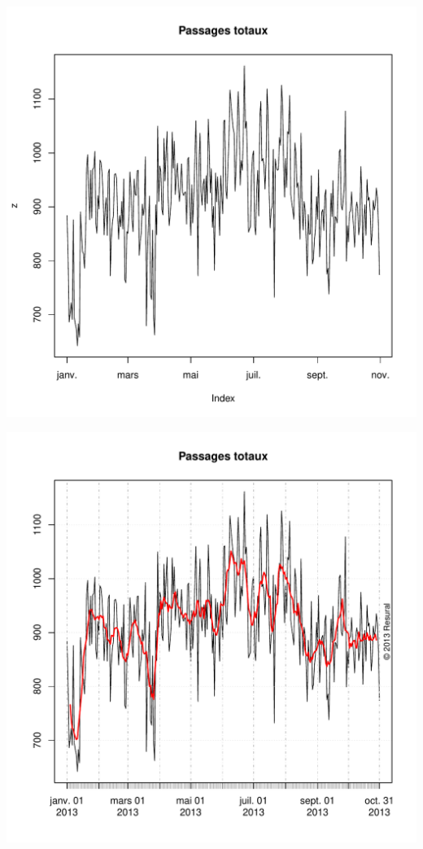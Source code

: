 \documentclass[12pt,english,french,twoside]{report}\usepackage[]{graphicx}\usepackage[]{color}
\makeatletter
\def\maxwidth{ %
  \ifdim\Gin@nat@width>\linewidth
    \linewidth
  \else
    \Gin@nat@width
  \fi
}
\makeatother
\begin{document}
\includegraphics[width=\maxwidth]{figure/passages_totaux2} 

\includegraphics[width=\maxwidth]{figure/passages_totaux3} 
\end{document}
